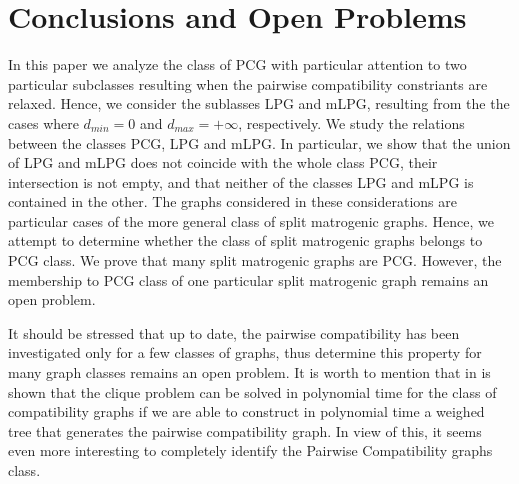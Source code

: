 \documentclass[dvipdfm]{llncs}
\newcommand{\dmin}{d_{min}}
\newcommand{\dmax}{d_{max}}
\begin{document}
\section{Conclusions and Open Problems}\label{sec:conclusion}


In this paper we analyze the class of PCG with particular attention to two particular subclasses resulting when the pairwise compatibility constriants are relaxed. Hence, we consider the sublasses LPG and mLPG, resulting from the the cases where $\dmin=0$ and $\dmax=+\infty$, respectively. We study the relations between the classes PCG, LPG and mLPG. In particular, we show that the union of LPG and mLPG does not coincide with the whole class PCG, their intersection is not empty, and that neither of the classes LPG and mLPG is contained in the other.  The graphs considered in these considerations are particular cases of the more general class of split matrogenic graphs. Hence,  we attempt to determine whether the class of split  matrogenic graphs belongs to PCG class. We prove that many split matrogenic graphs are PCG. However, the membership to PCG class of one particular split matrogenic graph remains an open problem.  

It should be stressed that up to date, the pairwise compatibility has been investigated only for a few classes of graphs, thus determine this property for many graph classes remains an open problem.  It is worth to mention that in \cite{Kal03} is shown that the clique problem can be solved in polynomial time for the class of compatibility graphs if we are able to construct in polynomial time a weighed tree that generates the pairwise compatibility graph.  In view of this, it seems even more interesting to completely identify the Pairwise Compatibility graphs class.  
\end{document}
